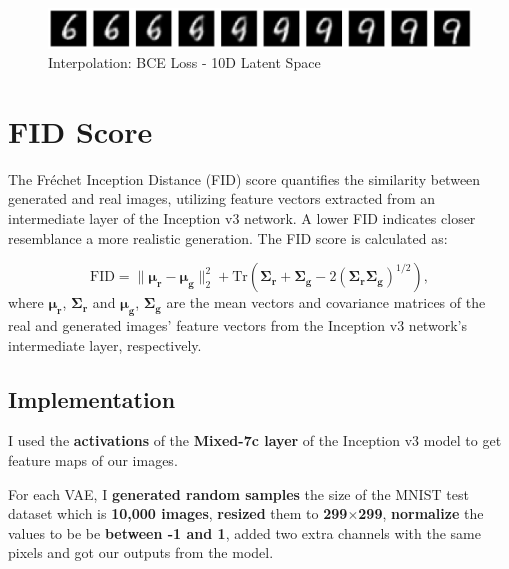 \documentclass[12pt]{article}
\begin{document}
\begin{figure}[h]
\centering
\includegraphics[width=1\linewidth]{report_images/bce_10D/interpolation.png}
\caption{\label{fig:inter_bce_10D}Interpolation: BCE Loss - 10D Latent Space}
\end{figure}
\FloatBarrier




\section{FID Score}
The Fréchet Inception Distance (FID) score quantifies the similarity between generated and real images, utilizing feature vectors extracted from an intermediate layer of the Inception v3 network. A lower FID indicates closer resemblance a more realistic generation. The FID score is calculated as:

\begin{equation}
\text{FID} = \|\boldsymbol{\mu_r} - \boldsymbol{\mu_g}\|^2_2 + \text{Tr}(\boldsymbol{\Sigma_r} + \boldsymbol{\Sigma_g} - 2(\boldsymbol{\Sigma_r\Sigma_g})^{1/2}),
\end{equation}
where $ \boldsymbol{\mu_r}$, $\boldsymbol{\Sigma_r}$ and $\boldsymbol{\mu_g}$, $\boldsymbol{\Sigma_g}$ are the mean vectors and covariance matrices of the real and generated images' feature vectors from the Inception v3 network's intermediate layer, respectively.

\subsection{Implementation}
I used the \textbf{activations} of the \textbf{Mixed-7c layer} of the Inception v3 model to get feature maps of our images.

For each VAE, I \textbf{generated random samples} the size of the MNIST test dataset which is \textbf{10,000 images}, \textbf{resized} them to \textbf{299$\times$299}, \textbf{normalize} the values to be be \textbf{between -1 and 1}, added two extra channels with the same pixels and got our outputs from the model.
\end{document}
